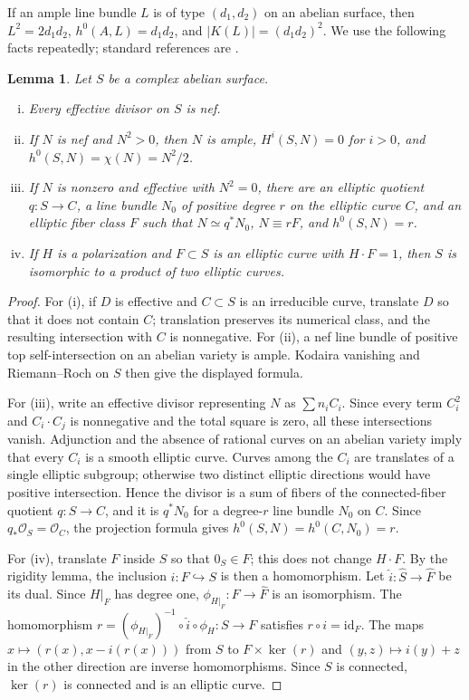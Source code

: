 \documentclass[12pt]{amsart}
\numberwithin{equation}{section}
\newtheorem{lemma}[theorem]{Lemma}
\theoremstyle{definition}
\theoremstyle{remark}
\newcommand{\cO}{\mathcal O}
\begin{document}
If an ample line bundle $L$ is of type $(d_1,d_2)$ on an abelian surface, then
$L^2=2d_1d_2$, $h^0(A,L)=d_1d_2$, and
$|K(L)|=(d_1d_2)^2$.
We use the following facts repeatedly; standard references are
\cite{MumfordAV,BL}.

\begin{lemma}\label{lem:standard}
Let $S$ be a complex abelian surface.
\begin{enumerate}[(i)]
\item Every effective divisor on $S$ is nef.
\item If $N$ is nef and $N^2>0$, then $N$ is ample,
      $H^i(S,N)=0$ for $i>0$, and
      $h^0(S,N)=\chi(N)=N^2/2$.
\item If $N$ is nonzero and effective with $N^2=0$, there are an elliptic
      quotient $q:S\to C$,
      a line bundle $N_0$ of positive degree $r$ on the elliptic curve
      $C$, and an elliptic fiber class $F$ such that
      $N\simeq q^*N_0$, $N\equiv rF$, and $h^0(S,N)=r$.
\item If $H$ is a polarization and $F\subset S$ is an elliptic curve with
      $H\cdot F=1$, then $S$ is isomorphic to a product of two elliptic
      curves.
\end{enumerate}
\end{lemma}

\begin{proof}
For (i), if $D$ is effective and $C\subset S$ is an irreducible curve,
translate $D$ so that it does not contain $C$; translation preserves its
numerical class, and the resulting intersection with $C$ is nonnegative.
For (ii), a nef line bundle of positive top self-intersection on an abelian
variety is ample.  Kodaira vanishing and Riemann--Roch on $S$ then give the
displayed formula.

For (iii), write an effective divisor representing $N$ as
$\sum n_iC_i$.  Since every term $C_i^2$ and $C_i\cdot C_j$ is
nonnegative and the total square is zero, all these intersections vanish.
Adjunction and the absence of rational curves on an abelian variety imply
that every $C_i$ is a smooth elliptic curve.  Curves among the $C_i$ are
translates of a single elliptic subgroup; otherwise two distinct elliptic
directions would have positive intersection.  Hence the divisor is a sum
of fibers of the connected-fiber quotient $q:S\to C$, and it is
$q^*N_0$ for a degree-$r$ line bundle $N_0$ on $C$.  Since
$q_*\cO_S=\cO_C$, the projection formula gives
$h^0(S,N)=h^0(C,N_0)=r$.

For (iv), translate $F$ inside $S$ so that $0_S\in F$; this does not
change $H\cdot F$.  By the rigidity lemma, the inclusion
$i:F\hookrightarrow S$ is then a homomorphism.  Let
$\widehat i:\widehat S\to\widehat F$ be its dual.  Since $H|_F$ has
degree one, $\phi_{H|_F}:F\to\widehat F$ is an isomorphism.  The
homomorphism
$r=(\phi_{H|_F})^{-1}\circ\widehat i\circ\phi_H:S\to F$ satisfies
$r\circ i=\mathrm{id}_F$.  The maps
$x\mapsto(r(x),x-i(r(x)))$ from $S$ to $F\times\ker(r)$ and
$(y,z)\mapsto i(y)+z$ in the other direction are inverse homomorphisms.
Since $S$ is connected, $\ker(r)$ is connected and is an elliptic curve.
\end{proof}
\end{document}

